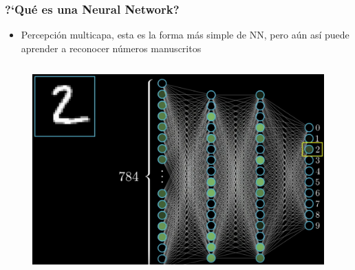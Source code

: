 \documentclass[10pt]{beamer}
\begin{document}
\begin{frame}
\begin{columns}
\end{columns}

\end{frame}


\begin{frame}
\frametitle{?`Qu\'e es una Neural Network?}
\begin{beamerboxesrounded}[upper=uppercolor, lower=lowercolor, shadow=true]{} 

\begin{itemize}
 \item  Percepci\'on multicapa, esta es la forma m\'as simple de NN, pero a\'un as\'i puede aprender a reconocer n\'umeros manuscritos 
  
\end{itemize}
\end{beamerboxesrounded}

\begin{columns}
\begin{column}{.5\textwidth}
 \begin{figure}
 \begin{center}
  \includegraphics[scale=0.175]{./Figures/dos_NN.png} 
 \end{center}
 \end{figure}  
\end{column}%


\end{columns}
\end{frame}
\end{document}
